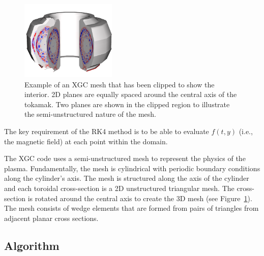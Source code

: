 \begin{figure}[htb]
  \centering
  \includegraphics[height=1.5in]{figures/xgc2.png}
\vspace{-.15in}
  \caption{Example of an XGC mesh that has been clipped to show the interior. 2D planes are equally spaced around the central axis of the tokamak. Two planes are shown in the clipped region to illustrate the semi-unstructured nature of the mesh.}
  \label{fig:xgc_mesh}
\end{figure}

The key requirement of the RK4 method is to be able to evaluate $f(t,y)$ (i.e., the magnetic field) at each point within the domain.

The XGC code uses a semi-unstructured mesh to represent the physics of the plasma. Fundamentally, the mesh is cylindrical with periodic boundary conditions along the cylinder's axis. The mesh is structured along the axis of the cylinder and each toroidal cross-section is a 2D unstructured triangular mesh.
The cross-section is rotated around the central axis to create the 3D mesh (see  Figure~\ref{fig:xgc_mesh}).
The mesh consists of wedge elements that are formed from pairs of triangles from adjacent planar cross sections.


\subsection{\poincare Algorithm}
\label{sec:algorithm}
\algnewcommand{}
\algnewcommand\ForEach{\item[ \algorithmicforeach]}


